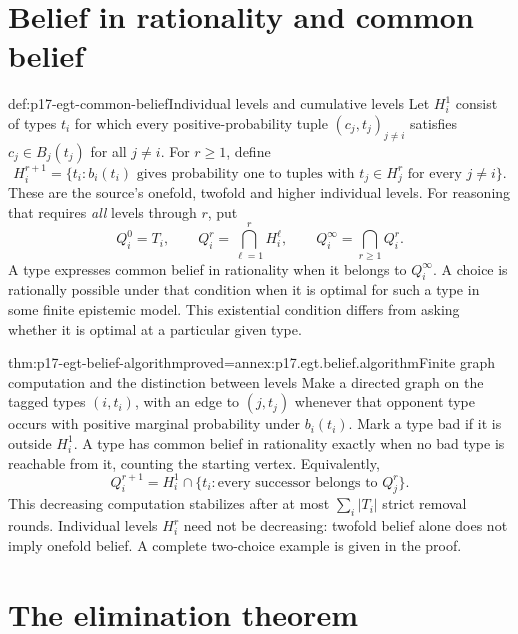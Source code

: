 \section{Belief in rationality and common belief}

\begin{hbdefinition}{def:p17-egt-common-belief}{Individual levels and cumulative levels}
Let \(H_i^1\) consist of types \(t_i\) for which every
positive-probability tuple \((c_j,t_j)_{j\ne i}\) satisfies
\(c_j\in B_j(t_j)\) for all \(j\ne i\).
For \(r\geq1\), define
\[
 H_i^{r+1}=\{t_i:b_i(t_i)\text{ gives probability one to tuples
                         with }t_j\in H_j^r\text{ for every }j\ne i\}.
\]
These are the source's onefold, twofold and higher individual levels.
For reasoning that requires \emph{all} levels through \(r\), put
\[
 Q_i^0=T_i,\qquad Q_i^r=\bigcap_{\ell=1}^{r}H_i^\ell,\qquad
 Q_i^\infty=\bigcap_{r\geq1}Q_i^r .
\]
A type expresses common belief in rationality when it belongs to
\(Q_i^\infty\). A choice is rationally possible under that condition
when it is optimal for such a type in some finite epistemic model.
This existential condition differs from asking whether it is optimal
at a particular given type.
\end{hbdefinition}

\begin{hbtheorem}{thm:p17-egt-belief-algorithm}{proved=annex:p17.egt.belief.algorithm}{Finite graph computation and the distinction between levels}
Make a directed graph on the tagged types \((i,t_i)\), with an edge
to \((j,t_j)\) whenever that opponent type occurs with positive
marginal probability under \(b_i(t_i)\). Mark a type bad if it is
outside \(H_i^1\). A type has common belief in rationality exactly
when no bad type is reachable from it, counting the starting vertex.
Equivalently,
\[
 Q_i^{r+1}=H_i^1\cap
       \{t_i:\text{every successor belongs to }Q_j^r\}.
\]
This decreasing computation stabilizes after at most
\(\sum_i|T_i|\) strict removal rounds. Individual levels \(H_i^r\)
need not be decreasing: twofold belief alone does not imply onefold
belief. A complete two-choice example is given in the proof.
\end{hbtheorem}

\section{The elimination theorem}

